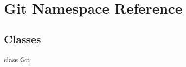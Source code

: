 \hypertarget{namespaceGit}{\section{Git Namespace Reference}
\label{namespaceGit}
}
\subsection*{Classes}
\begin{DoxyCompactItemize}
\item 
class \hyperlink{classGit_1_1Git}{Git}
\end{DoxyCompactItemize}
